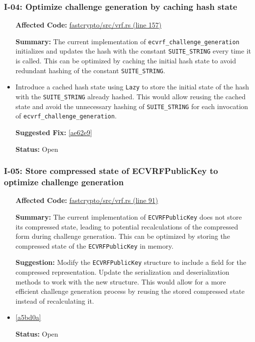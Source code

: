 \subsubsection*{I-04: Optimize challenge generation by caching hash state}
\begin{itemize}[align=left]
\item[\textbf{Affected Code:}] \href{https://github.com/MystenLabs/fastcrypto/blob/963205c6d0538fe548b8b10037cf87a53af6f424/fastcrypto/src/vrf.rs#L157}{fastcrypto/src/vrf.rs (line 157)}
\item[\textbf{Summary:}] The current implementation of \lstinline{ecvrf_challenge_generation} initializes and updates the hash with the constant \lstinline{SUITE_STRING} every time it is called. This can be optimized by caching the initial hash state to avoid redundant hashing of the constant \lstinline{SUITE_STRING}.
\item[\textbf{Suggestion:}] Introduce a cached hash state using \lstinline{Lazy} to store the initial state of the hash with the \lstinline{SUITE_STRING} already hashed. This would allow reusing the cached state and avoid the unnecessary hashing of \lstinline{SUITE_STRING} for each invocation of \lstinline{ecvrf_challenge_generation}.
\item[\textbf{Suggested Fix:}] \href{https://github.com/MystenLabs/fastcrypto/pull/543/commits/ae62e9bdb527574974a34413ef540d3f29d38d87}{[ae62e9]}
\item[\textbf{Status:}] Open
\end{itemize}

\subsubsection*{I-05: Store compressed state of ECVRFPublicKey to optimize challenge generation}
\begin{itemize}[align=left]
\item[\textbf{Affected Code:}] \href{https://github.com/MystenLabs/fastcrypto/blob/963205c6d0538fe548b8b10037cf87a53af6f424/fastcrypto/src/vrf.rs#L91}{fastcrypto/src/vrf.rs (line 91)}
\item[\textbf{Summary:}] The current implementation of \lstinline{ECVRFPublicKey} does not store its compressed state, leading to potential recalculations of the compressed form during challenge generation. This can be optimized by storing the compressed state of the \lstinline{ECVRFPublicKey} in memory.
\item[\textbf{Suggestion:}] Modify the \lstinline{ECVRFPublicKey} structure to include a field for the compressed representation. Update the serialization and deserialization methods to work with the new structure. This would allow for a more efficient challenge generation process by reusing the stored compressed state instead of recalculating it.
\item[\textbf{Suggested Fix:}] \href{https://github.com/MystenLabs/fastcrypto/pull/543/commits/a5bd0a335c4120fb05db801895a778905aaffcac}{[a5bd0a]}
\item[\textbf{Status:}] Open
\end{itemize}

